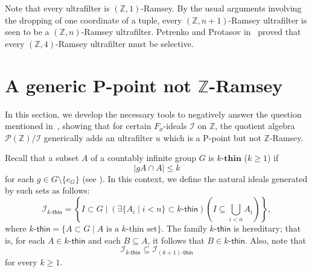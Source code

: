 \documentclass{amsart}
\theoremstyle{definition}
\theoremstyle{remark}
\numberwithin{equation}{section}
\newcommand{\kthin}{k\text{-}\mathsf{thin}}
\begin{document}
Note that every ultrafilter is $(\mathbb Z,1)$-Ramsey. By the usual arguments involving the dropping of one coordinate of a tuple, every $(\mathbb Z,n+1)$-Ramsey ultrafilter is seen to be a $(\mathbb Z,n)$-Ramsey ultrafilter. Petrenko and Protasov in~\cite{MR3681104} proved that every $(\mathbb Z,4)$-Ramsey ultrafilter must be selective.


\section{A generic P-point not \texorpdfstring{$\mathbb{Z}$}{Lg}-Ramsey}

In this section, we develop the necessary tools to negatively answer the question mentioned in~\cite[p. 458]{MR3681104}, showing that for certain $F_{\sigma}$-ideals $\mathcal{I}$ on $\mathbb{Z}$, the quotient algebra $\mathcal{P}(\mathbb{Z})/\mathcal{I}$ generically adds an ultrafilter $u$ which is a P-point but not $\mathbb{Z}$-Ramsey.

Recall that a subset $A$ of a countably infinite group $G$ is $k\textbf{-thin}$ ($k \geq 1$) if 
\[
  |gA \cap A|\leq k
\]
for each $g \in G\setminus \{e_{G}\}$ (see \cite{MR3681104, MR1834643}). In this context, we define the natural ideals generated by such sets as follows:
\[
\mathcal{I}_{\kthin}=\left\{I \subset G \mid  
\left(\exists \{A_{i}\mid  i < n\} \subset \kthin\right)
\left( I \subseteq \bigcup_{i<n}A_{i}\right)\right\},
\]
where $\kthin = \{A \subset G \mid  A \text{ is a $k$-thin set}\}$. The family $\kthin$ is hereditary; that is, for each $A \in \kthin$ and each $B \subseteq A$, it follows that $B \in \kthin$. Also, note that
\[
\mathcal{I}_{\kthin} \subseteq \mathcal{I}_{\text{$(k+1)$-$\mathsf{thin}$}}
\]
for every $k \geq 1$.
\end{document}
